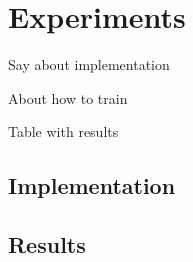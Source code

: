 \section{Experiments}
\label{sec:experiments}
Say about implementation

About how to train 

Table with results

\subsection{Implementation}




\subsection{Results}





